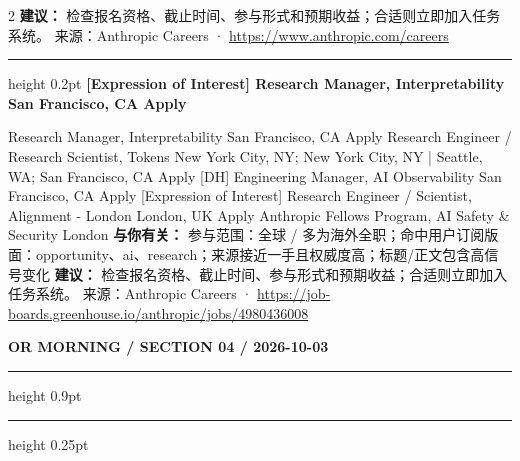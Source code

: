 \documentclass[10.5pt]{ctexart}
\begin{document}
\begin{multicols}{2}
\textbf{建议：} 检查报名资格、截止时间、参与形式和预期收益；合适则立即加入任务系统。
{\footnotesize\color{ormuted} 来源：Anthropic Careers · \url{https://www.anthropic.com/careers}}
\vspace{2mm}
\hrule height 0.2pt
\vspace{2mm}
{\large\bfseries [Expression of Interest] Research Manager, Interpretability San Francisco, CA Apply}\par
[Expression of Interest] Research Manager, Interpretability San Francisco, CA Apply Research Engineer / Research Scientist, Tokens New York City, NY; New York City, NY | Seattle, WA; San Francisco, CA Apply [DH] Engineering Manager, AI Observability San Francisco, CA Apply [Expression of Interest] Research Engineer / Scientist, Alignment - London London, UK Apply Anthropic Fellows Program, AI Safety \& Security London
\textbf{与你有关：} 参与范围：全球 / 多为海外全职；命中用户订阅版面：opportunity、ai、research；来源接近一手且权威度高；标题/正文包含高信号变化
\textbf{建议：} 检查报名资格、截止时间、参与形式和预期收益；合适则立即加入任务系统。
{\footnotesize\color{ormuted} 来源：Anthropic Careers · \url{https://job-boards.greenhouse.io/anthropic/jobs/4980436008}}
\end{multicols}
\newpage
{\small\bfseries OR MORNING / SECTION 04 / 2026-10-03}
\vspace{2mm}
\hrule height 0.9pt
\vspace{1.5mm}
\hrule height 0.25pt
\vspace{4mm}
\end{document}
